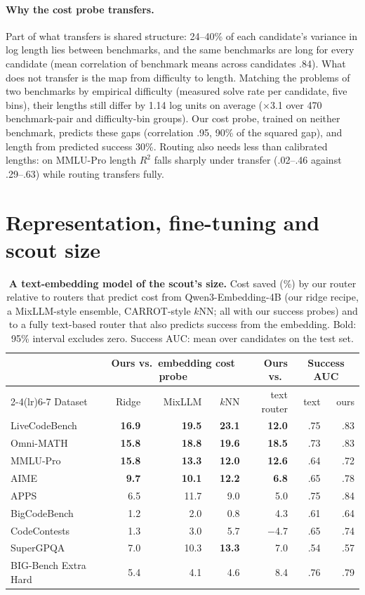 \documentclass[10pt]{article}
\begin{document}
\paragraph{Why the cost probe transfers.}
Part of what transfers is shared structure: 24--40\% of each candidate's variance in log length lies between benchmarks, and the same benchmarks are long for every candidate (mean correlation of benchmark means across candidates .84). What does not transfer is the map from difficulty to length. Matching the problems of two benchmarks by empirical difficulty (measured solve rate per candidate, five bins), their lengths still differ by 1.14 log units on average ($\times$3.1 over 470 benchmark-pair and difficulty-bin groups). Our cost probe, trained on neither benchmark, predicts these gaps (correlation .95, 90\% of the squared gap), and length from predicted success 30\%. Routing also needs less than calibrated lengths: on MMLU-Pro length $R^2$ falls sharply under transfer (.02--.46 against .29--.63) while routing transfers fully.


\FloatBarrier
\section{Representation, fine-tuning and scout size}\label{app:size}
\begin{table}[h]
\centering
\footnotesize
\setlength{\tabcolsep}{4pt}
\begin{tabular}{lrrrrrr}
\toprule
 & \multicolumn{3}{c}{Ours vs.\ embedding cost probe} & Ours vs.\ & \multicolumn{2}{c}{Success AUC} \\
\cmidrule(lr){2-4}\cmidrule(lr){6-7}
Dataset & Ridge & MixLLM & $k$NN & text router & text & ours \\
\midrule
LiveCodeBench & \textbf{16.9} & \textbf{19.5} & \textbf{23.1} & \textbf{12.0} & .75 & .83 \\
Omni-MATH & \textbf{15.8} & \textbf{18.8} & \textbf{19.6} & \textbf{18.5} & .73 & .83 \\
MMLU-Pro & \textbf{15.8} & \textbf{13.3} & \textbf{12.0} & \textbf{12.6} & .64 & .72 \\
AIME & \textbf{9.7} & \textbf{10.1} & \textbf{12.2} & \textbf{6.8} & .65 & .78 \\
APPS & 6.5 & 11.7 & 9.0 & 5.0 & .75 & .84 \\
BigCodeBench & 1.2 & 2.0 & 0.8 & 4.3 & .61 & .64 \\
CodeContests & 1.3 & 3.0 & 5.7 & $-$4.7 & .65 & .74 \\
SuperGPQA & 7.0 & 10.3 & \textbf{13.3} & 7.0 & .54 & .57 \\
BIG-Bench Extra Hard & 5.4 & 4.1 & 4.6 & 8.4 & .76 & .79 \\
\bottomrule
\end{tabular}
\caption{\textbf{A text-embedding model of the scout's size.} Cost saved (\%) by our router relative to routers that predict cost from Qwen3-Embedding-4B (our ridge recipe, a MixLLM-style ensemble, CARROT-style $k$NN; all with our success probes) and to a fully text-based router that also predicts success from the embedding. Bold: 95\% interval excludes zero. Success AUC: mean over candidates on the test set.}
\label{tab:textemb}
\end{table}
\end{document}

